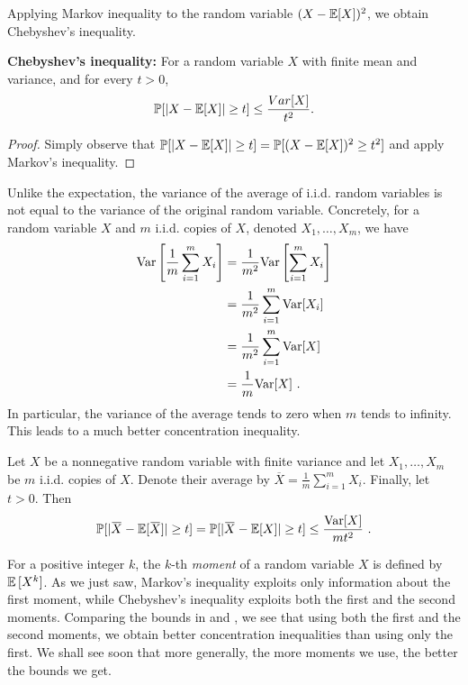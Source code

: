 Applying Markov inequality to the random variable $(X-\mathbb{E}[X])^2$, we obtain Chebyshev's inequality.
\begin{theorem} \textbf{Chebyshev's inequality:} For a random variable
  $X$ with finite mean and variance, and for every $t  > 0$,
\[
\operatorname*{\mathbb{P}}[|X-\mathbb{E} [X]| \geq t] \leq \frac{Var[X]}{t^2}.
\]
\end{theorem}
\begin{proof}
Simply observe that $\operatorname*{\mathbb{P}}[|X-\mathbb{E} [X]| \geq t] = \operatorname*{\mathbb{P}}[(X-\mathbb{E} [X])^2 \geq t^2]$ and apply Markov's inequality.
\end{proof}
Unlike the expectation, the variance of the average of i.i.d. random variables is not equal to the variance of the original random variable. Concretely, for a random variable $X$ and $m$ i.i.d. copies of $X$, denoted $X_1,\ldots, X_m$, we have
\begin{align} \label{eq:varAve}
{\mathrm {Var}} \left[\frac{1}{m} \sum_{i=1} ^m X_i \right] &= \frac{1}{m^2} {\mathrm {Var}} \left[\sum_{i=1} ^m X_i \right] \notag \\&
= \frac{1}{m^2} \sum_{i=1} ^m {\mathrm {Var}} [X_i] \notag \\&
= \frac{1}{m^2} \sum_{i=1} ^m {\mathrm {Var}} [X] \notag \\&
= \frac{1}{m} {\mathrm {Var}}[X]~.
\end{align}
In particular, the variance of the average tends to zero when $m$ tends to infinity. This leads to a much better concentration inequality.
\begin{corollary} \label{cor:chebysevAve}
Let $X$ be a nonnegative random variable with finite variance and let $X_1,\ldots,X_m$ be $m$ i.i.d. copies of $X$. Denote their average by $\overbar{X}=\frac{1}{m} \sum_{i=1} ^m X_i$. Finally, let $t>0$. Then
\[
\prob [|\overbar{X}-\E [\overbar{X}]| \geq t] = \prob [|\overbar{X}-\E [X]| \geq t] \leq \frac{\rV[X]}{mt^2}~.
\]
\end{corollary}

For a positive integer $k$, the $k$-th \emph{moment} of a random variable $X$ is defined by $\mathbb{E}\,[X^k]$. As we just saw, Markov's inequality exploits only information about the first moment, while Chebyshev's inequality exploits both the first and the second moments. Comparing the bounds in  and , we see that using both the first and the second moments, we obtain better concentration inequalities than using only the first. We shall see soon that more generally, the more moments we use, the better the bounds we get.


